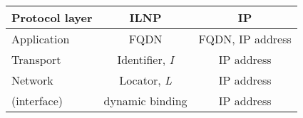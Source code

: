 \documentclass{article}
\begin{document}
\begin{table}[ht]
\centering
\begin{tabular}{| l | c | c |} 
	\hline
	Protocol layer & ILNP & IP \\
	\hline\hline
	Application & FQDN & FQDN, IP address \\
	\hline
	Transport & Identifier, \textit{I} & IP address \\
	\hline
	Network & Locator, \textit{L} & IP address \\
	\hline
	(interface) & dynamic binding & IP address \\
	\hline
\end{tabular}
\end{table}
\end{document}
